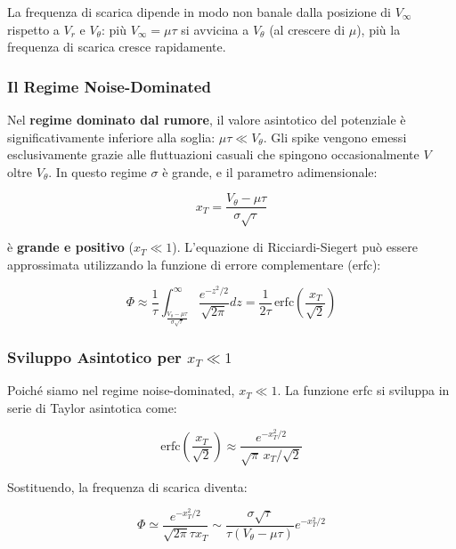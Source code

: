 La frequenza di scarica dipende in modo non banale dalla posizione di $V_\infty$ rispetto a $V_r$ e $V_\theta$: più $V_\infty = \mu\tau$ si avvicina a $V_\theta$ (al crescere di $\mu$), più la frequenza di scarica cresce rapidamente.



\subsubsection{Il Regime Noise-Dominated}

Nel \textbf{regime dominato dal rumore}, il valore asintotico del potenziale è significativamente inferiore alla soglia: $\mu\tau \ll V_\theta$. Gli spike vengono emessi esclusivamente grazie alle fluttuazioni casuali che spingono occasionalmente $V$ oltre $V_\theta$. In questo regime $\sigma$ è grande, e il parametro adimensionale:

\begin{equation}
x_T = \frac{V_\theta - \mu\tau}{\sigma\sqrt{\tau}}
\end{equation}

è \textbf{grande e positivo} ($x_T \ll 1$). L'equazione di Ricciardi-Siegert può essere approssimata utilizzando la funzione di errore complementare (erfc):

\begin{equation}
\Phi \approx \frac{1}{\tau} \int_{\frac{V_\theta - \mu\tau}{\sigma\sqrt{\tau}}}^\infty \frac{e^{-z^2/2}}{\sqrt{2\pi}} dz = \frac{1}{2\tau}\,\text{erfc}\!\left(\frac{x_T}{\sqrt{2}}\right)
\end{equation}

\subsubsection{Sviluppo Asintotico per $x_T \ll 1$}

Poiché siamo nel regime noise-dominated, $x_T \ll 1$. La funzione erfc si sviluppa in serie di Taylor asintotica come:

\begin{equation}
\text{erfc}\!\left(\frac{x_T}{\sqrt{2}}\right) \approx \frac{e^{-x_T^2/2}}{\sqrt{\pi}\, x_T/\sqrt{2}}
\end{equation}

Sostituendo, la frequenza di scarica diventa:

\begin{equation}
\Phi \simeq \frac{e^{-x_T^2 / 2}}{\sqrt{2\pi} \tau x_T} \sim \frac{\sigma\sqrt{\tau}}{\tau(V_\theta - \mu\tau)} e^{-x_T^2 / 2}
\end{equation}

